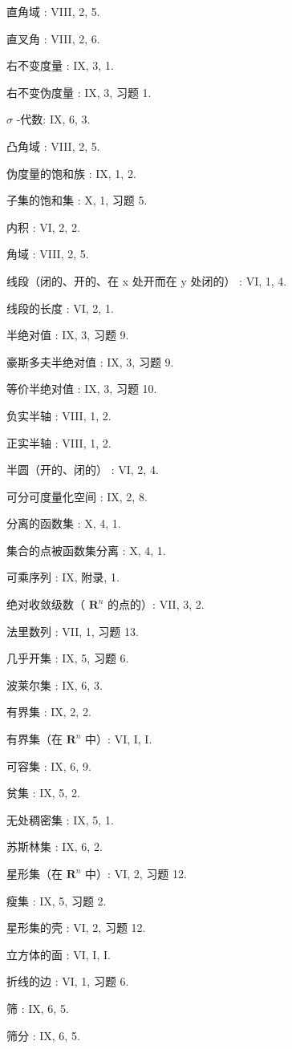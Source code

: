 直角域 : VIII, 2, 5.

直叉角 : VIII, 2, 6.

右不变度量 : IX, 3, 1.

右不变伪度量 : IX, 3, 习题 1.

\(\sigma\) -代数: IX, 6, 3.

凸角域 : VIII, 2, 5.

伪度量的饱和族 : IX, 1, 2.

子集的饱和集 : X, 1, 习题 5.

内积 : VI, 2, 2.

角域 : VIII, 2, 5.

线段（闭的、开的、在 x 处开而在 y 处闭的） : VI, 1, 4.

线段的长度 : VI, 2, 1.

半绝对值 : IX, 3, 习题 9.

豪斯多夫半绝对值 : IX, 3, 习题 9.

等价半绝对值 : IX, 3, 习题 10.

负实半轴 : VIII, 1, 2.

正实半轴 : VIII, 1, 2.

半圆（开的、闭的） : VI, 2, 4.

可分可度量化空间 : IX, 2, 8.

分离的函数集 : X, 4, 1.

集合的点被函数集分离 : X, 4, 1.

可乘序列 : IX, 附录, 1.

绝对收敛级数（ \(\mathbf{R}^n\) 的点的）: VII, 3, 2.

法里数列 : VII, 1, 习题 13.

几乎开集 : IX, 5, 习题 6.

波莱尔集 : IX, 6, 3.

有界集 : IX, 2, 2.

有界集（在 \(\mathbf{R}^n\) 中）: VI, I, I.

可容集 : IX, 6, 9.

贫集 : IX, 5, 2.

无处稠密集 : IX, 5, 1.

苏斯林集 : IX, 6, 2.

星形集（在 \(\mathbf{R}^n\) 中）: VI, 2, 习题 12.

瘦集 : IX, 5, 习题 2.

星形集的壳 : VI, 2, 习题 12.

立方体的面 : VI, I, I.

折线的边 : VI, 1, 习题 6.

筛 : IX, 6, 5.

筛分 : IX, 6, 5.

